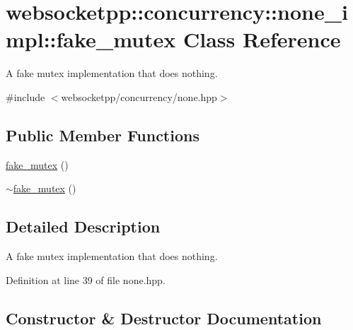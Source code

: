 \hypertarget{classwebsocketpp_1_1concurrency_1_1none__impl_1_1fake__mutex}{}\section{websocketpp\+:\+:concurrency\+:\+:none\+\_\+impl\+:\+:fake\+\_\+mutex Class Reference}
\label{classwebsocketpp_1_1concurrency_1_1none__impl_1_1fake__mutex}


A fake mutex implementation that does nothing.  




{\ttfamily \#include $<$websocketpp/concurrency/none.\+hpp$>$}

\subsection*{Public Member Functions}
\begin{DoxyCompactItemize}
\item 
\hyperlink{classwebsocketpp_1_1concurrency_1_1none__impl_1_1fake__mutex_ae0d195982a53fda6c5108e0a959455e6}{fake\+\_\+mutex} ()
\item 
\hyperlink{classwebsocketpp_1_1concurrency_1_1none__impl_1_1fake__mutex_a039c81f54e5a650da5182050477bc34b}{$\sim$fake\+\_\+mutex} ()
\end{DoxyCompactItemize}


\subsection{Detailed Description}
A fake mutex implementation that does nothing. 

Definition at line 39 of file none.\+hpp.



\subsection{Constructor \& Destructor Documentation}
\hypertarget{classwebsocketpp_1_1concurrency_1_1none__impl_1_1fake__mutex_ae0d195982a53fda6c5108e0a959455e6}{}
